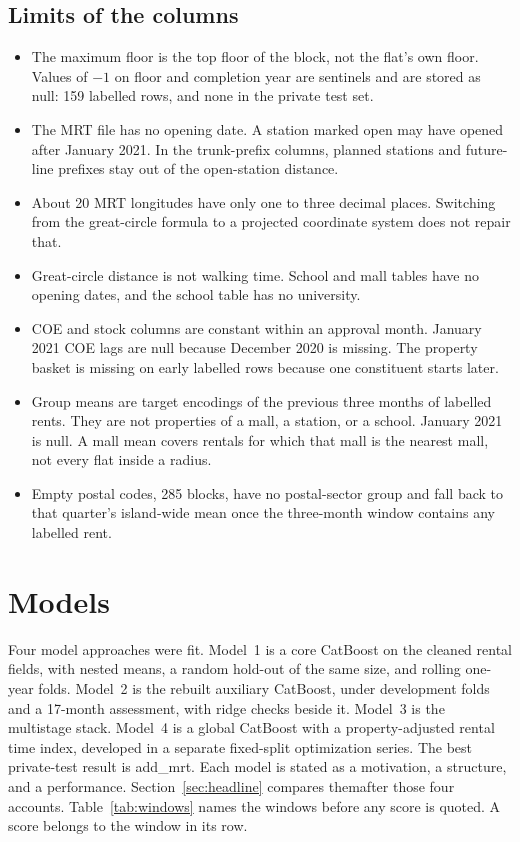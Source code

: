 \documentclass[11pt,a4paper]{article}
\begin{document}
\subsection{Limits of the columns}
\label{sec:collimits}

\begin{itemize}
\item The maximum floor is the top floor of the block, not the flat's own floor.
Values of \(-1\) on floor and completion year are sentinels and are stored as null: 159 labelled rows, and none in the private test set.
\item The MRT file has no opening date.
A station marked open may have opened after January 2021.
In the trunk-prefix columns, planned stations and future-line prefixes stay out of the open-station distance.
\item About 20 MRT longitudes have only one to three decimal places.
Switching from the great-circle formula to a projected coordinate system does not repair that.
\item Great-circle distance is not walking time.
School and mall tables have no opening dates, and the school table has no university.
\item COE and stock columns are constant within an approval month.
January 2021 COE lags are null because December 2020 is missing.
The property basket is missing on early labelled rows because one constituent starts later.
\item Group means are target encodings of the previous three months of labelled rents.
They are not properties of a mall, a station, or a school.
January 2021 is null.
A mall mean covers rentals for which that mall is the nearest mall, not every flat inside a radius.
\item Empty postal codes, 285 blocks, have no postal-sector group and fall back to that quarter's island-wide mean once the three-month window contains any labelled rent.
\end{itemize}

\FloatBarrier
\section{Models}
\label{sec:models}

Four model approaches were fit.
Model~1 is a core CatBoost on the cleaned rental fields, with nested means, a random hold-out of the same size, and rolling one-year folds.
Model~2 is the rebuilt auxiliary CatBoost, under development folds and a 17-month assessment, with ridge checks beside it.
Model~3 is the multistage stack.
Model~4 is a global CatBoost with a property-adjusted rental
time index, developed in a separate fixed-split optimization series.
The best private-test result is add\_mrt.
Each model is stated as a motivation, a structure, and a performance.
Section~\ref{sec:headline} compares themafter those four accounts.
Table~\ref{tab:windows} names the windows before any score is quoted.
A score belongs to the window in its row.
\end{document}

